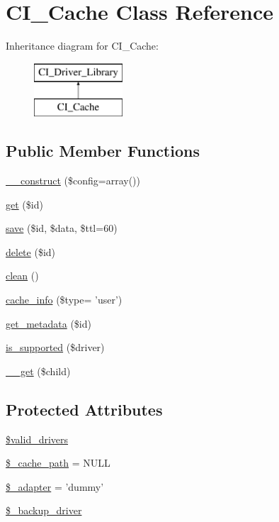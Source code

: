 \hypertarget{class_c_i___cache}{\section{C\-I\-\_\-\-Cache Class Reference}
\label{class_c_i___cache}
}
Inheritance diagram for C\-I\-\_\-\-Cache\-:\begin{figure}[H]
\begin{center}
\leavevmode
\includegraphics[height=2.000000cm]{class_c_i___cache}
\end{center}
\end{figure}
\subsection*{Public Member Functions}
\begin{DoxyCompactItemize}
\item 
\hyperlink{class_c_i___cache_af7f9493844d2d66e924e3c1df51ce616}{\-\_\-\-\_\-construct} (\$config=array())
\item 
\hyperlink{class_c_i___cache_a50e3bfb586b2f42932a6a93f3fbb0828}{get} (\$id)
\item 
\hyperlink{class_c_i___cache_a747c50183a4ed7009899628fa75c562b}{save} (\$id, \$data, \$ttl=60)
\item 
\hyperlink{class_c_i___cache_a2f8258add505482d7f00ea26493a5723}{delete} (\$id)
\item 
\hyperlink{class_c_i___cache_adb40b812890a8bc058bf6b7a0e1a54d9}{clean} ()
\item 
\hyperlink{class_c_i___cache_ac0fc0f9f3f8834ecae4af292bb4e9bc5}{cache\-\_\-info} (\$type= 'user')
\item 
\hyperlink{class_c_i___cache_a59635cf18e997c5141bffa05ff7622e0}{get\-\_\-metadata} (\$id)
\item 
\hyperlink{class_c_i___cache_a6901d466745bfdfe4dc772fa012c99eb}{is\-\_\-supported} (\$driver)
\item 
\hyperlink{class_c_i___cache_a2fac4d4694e05e7eeba5282bd6ff8caf}{\-\_\-\-\_\-get} (\$child)
\end{DoxyCompactItemize}
\subsection*{Protected Attributes}
\begin{DoxyCompactItemize}
\item 
\hyperlink{class_c_i___cache_a32d963b3d49fd67f188c1a74d38be6df}{\$valid\-\_\-drivers}
\item 
\hyperlink{class_c_i___cache_ae9407d6ae1ddd132cca3c7f855f89dfe}{\$\-\_\-cache\-\_\-path} = N\-U\-L\-L
\item 
\hyperlink{class_c_i___cache_a465f293474a3bbb7341af052f7de13d7}{\$\-\_\-adapter} = 'dummy'
\item 
\hyperlink{class_c_i___cache_a6e11e902e473d1345a4caa11236ac828}{\$\-\_\-backup\-\_\-driver}
\end{DoxyCompactItemize}



